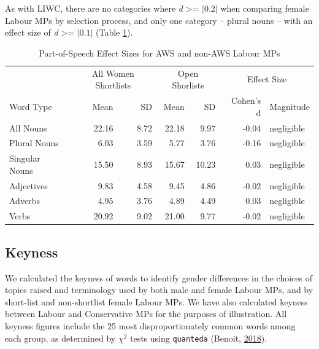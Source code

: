 \documentclass[]{article}
\theoremstyle{definition}
\theoremstyle{definition}
\theoremstyle{definition}
\theoremstyle{remark}
\begin{document}
As with LIWC, there are no categories where \emph{d} \textgreater{}=
\(|0.2|\) when comparing female Labour MPs by selection process, and
only one category -- plural nouns -- with an effect size of \emph{d}
\textgreater{}= \(|0.1|\) (Table \ref{tab:pos-sl-table}).

\begin{table}[H]

\caption{\label{tab:pos-sl-table}Part-of-Speech Effect Sizes for AWS and non-AWS Labour MPs}
\centering
\begin{tabular}[t]{lrrrrrl}
\toprule
\multicolumn{1}{c}{ } & \multicolumn{2}{c}{All Women Shortlists} & \multicolumn{2}{c}{Open Shorlists} & \multicolumn{2}{c}{Effect Size} \\
\cmidrule(l{2pt}r{2pt}){2-3} \cmidrule(l{2pt}r{2pt}){4-5} \cmidrule(l{2pt}r{2pt}){6-7}
Word Type & Mean & SD & Mean & SD & Cohen's d & Magnitude\\
\midrule
All Nouns & 22.16 & 8.72 & 22.18 & 9.97 & -0.04 & negligible\\
\hspace{1em}Plural Nouns & 6.03 & 3.59 & 5.77 & 3.76 & -0.16 & negligible\\
\hspace{1em}Singular Nouns & 15.50 & 8.93 & 15.67 & 10.23 & 0.03 & negligible\\
Adjectives & 9.83 & 4.58 & 9.45 & 4.86 & -0.02 & negligible\\
Adverbs & 4.95 & 3.76 & 4.89 & 4.49 & 0.03 & negligible\\
Verbs & 20.92 & 9.02 & 21.00 & 9.77 & -0.02 & negligible\\
\bottomrule
\end{tabular}
\end{table}

\hypertarget{keyness}{%
\subsection{Keyness}\label{keyness}}

We calculated the keyness of words to identify gender differences in the
choices of topics raised and terminology used by both male and female
Labour MPs, and by short-list and non-shortlist female Labour MPs. We
have also calculated keyness between Labour and Conservative MPs for the
purposes of illustration. All keyness figures include the 25 most
disproportionately common words among each group, as determined by
\({\chi}^2\) tests using \texttt{quanteda} (Benoit,
\protect\hyperlink{ref-benoit2018}{2018}).
\end{document}
